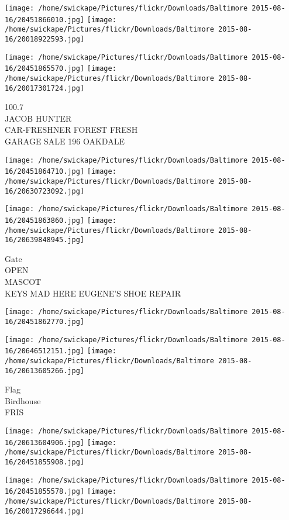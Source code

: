 \documentclass[10pt,letterpaper]{article}
\begin{document}
\texttt{[image: /home/swickape/Pictures/flickr/Downloads/Baltimore 2015-08-16/20451866010.jpg]}
\texttt{[image: /home/swickape/Pictures/flickr/Downloads/Baltimore 2015-08-16/20018922593.jpg]}

\texttt{[image: /home/swickape/Pictures/flickr/Downloads/Baltimore 2015-08-16/20451865570.jpg]}
\texttt{[image: /home/swickape/Pictures/flickr/Downloads/Baltimore 2015-08-16/20017301724.jpg]}

100.7\\
JACOB HUNTER\\
CAR{-}FRESHNER FOREST FRESH\\
GARAGE SALE 196 OAKDALE
\pagebreak

\texttt{[image: /home/swickape/Pictures/flickr/Downloads/Baltimore 2015-08-16/20451864710.jpg]}
\texttt{[image: /home/swickape/Pictures/flickr/Downloads/Baltimore 2015-08-16/20630723092.jpg]}

\texttt{[image: /home/swickape/Pictures/flickr/Downloads/Baltimore 2015-08-16/20451863860.jpg]}
\texttt{[image: /home/swickape/Pictures/flickr/Downloads/Baltimore 2015-08-16/20639848945.jpg]}

Gate\\
OPEN\\
MASCOT\\
KEYS MAD HERE EUGENE'S SHOE REPAIR
\pagebreak

\texttt{[image: /home/swickape/Pictures/flickr/Downloads/Baltimore 2015-08-16/20451862770.jpg]}

\vspace{0.25in}
\texttt{[image: /home/swickape/Pictures/flickr/Downloads/Baltimore 2015-08-16/20646512151.jpg]}
\texttt{[image: /home/swickape/Pictures/flickr/Downloads/Baltimore 2015-08-16/20613605266.jpg]}

Flag\\
Birdhouse\\
FRIS
\pagebreak

\texttt{[image: /home/swickape/Pictures/flickr/Downloads/Baltimore 2015-08-16/20613604906.jpg]}
\texttt{[image: /home/swickape/Pictures/flickr/Downloads/Baltimore 2015-08-16/20451855908.jpg]}

\texttt{[image: /home/swickape/Pictures/flickr/Downloads/Baltimore 2015-08-16/20451855578.jpg]}
\texttt{[image: /home/swickape/Pictures/flickr/Downloads/Baltimore 2015-08-16/20017296644.jpg]}
\end{document}
